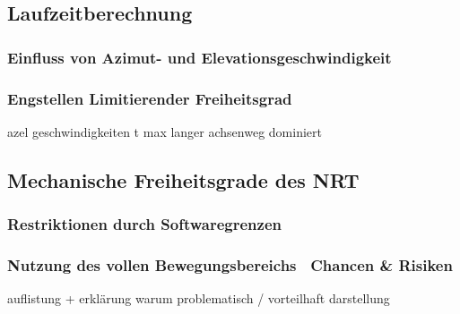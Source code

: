 \subsection{Laufzeitberechnung}

\subsubsection{Einfluss von Azimut- und Elevationsgeschwindigkeit}
\subsubsection{Engstellen \textendash Limitierender Freiheitsgrad}

azel geschwindigkeiten
t max
langer achsenweg dominiert

\subsection{Mechanische Freiheitsgrade des NRT}

\subsubsection{Restriktionen durch Softwaregrenzen}
\subsubsection{Nutzung des vollen Bewegungsbereichs \textendash~Chancen \& Risiken}

auflistung + erklärung warum problematisch / vorteilhaft
darstellung


